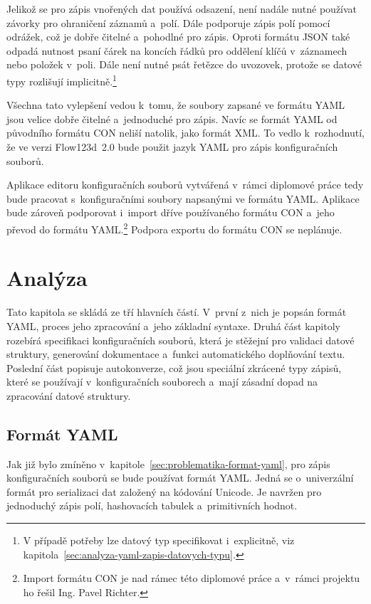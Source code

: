 \documentclass[FM,bw,DP]{tulthesis}
\begin{document}
Jelikož se pro zápis vnořených dat používá odsazení, není nadále nutné používat závorky pro ohraničení záznamů a~polí. Dále podporuje zápis polí pomocí odrážek, což je dobře čitelné a~pohodlné pro zápis. Oproti formátu \gls{JSON} také odpadá nutnost psaní čárek na koncích řádků pro oddělení klíčů v~záznamech nebo položek v~poli. Dále není nutné psát řetězce do uvozovek, protože se datové typy rozlišují implicitně.\footnote{V případě potřeby lze datový typ specifikovat i~explicitně, viz kapitola~\ref{sec:analyza-yaml-zapis-datovych-typu}.}

Všechna tato vylepšení vedou k~tomu, že soubory zapsané ve formátu \gls{YAML} jsou velice dobře čitelné a~jednoduché pro zápis. Navíc se formát \gls{YAML} od původního formátu \gls{CON} neliší natolik, jako formát \gls{XML}. To vedlo k~rozhodnutí, že ve verzi Flow123d~2.0 bude použit jazyk \gls{YAML} pro zápis konfiguračních souborů.

Aplikace editoru konfiguračních souborů vytvářená v~rámci diplomové práce tedy bude pracovat s~konfiguračními soubory napsanými ve formátu \gls{YAML}. Aplikace bude zároveň podporovat i~import dříve používaného formátu \gls{CON} a~jeho převod do formátu \gls{YAML}.\footnote{Import formátu CON je nad rámec této diplomové práce a~v~rámci projektu ho řešil Ing. Pavel Richter.} Podpora exportu do formátu \gls{CON} se neplánuje.


\chapter{Analýza}

Tato kapitola se skládá ze tří hlavních částí. V~první z~nich je popsán formát \gls{YAML}, proces jeho zpracování a~jeho základní syntaxe. Druhá část kapitoly rozebírá specifikaci konfiguračních souborů, která je stěžejní pro validaci datové struktury, generování dokumentace a~funkci automatického doplňování textu. Poslední část popisuje autokonverze, což jsou speciální zkrácené typy zápisů, které se používají v~konfiguračních souborech a~mají zásadní dopad na zpracování datové struktury.


\section{Formát YAML}
Jak již bylo zmíněno v~kapitole~\ref{sec:problematika-format-yaml}, pro zápis konfiguračních souborů se bude používat formát \gls{YAML}. Jedná se o~univerzální formát pro serializaci dat založený na kódování Unicode. Je navržen pro jednoduchý zápis polí, hashovacích tabulek a~primitivních hodnot.
\end{document}
